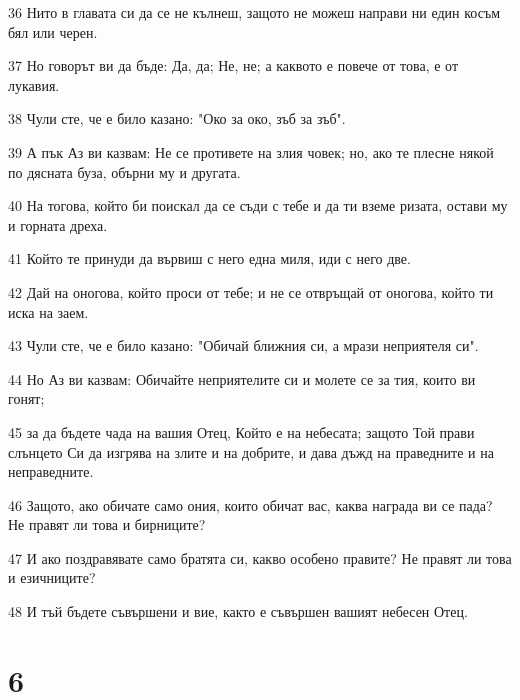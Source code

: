\par 36 Нито в главата си да се не кълнеш, защото не можеш направи ни един косъм бял или черен.
\par 37 Но говорът ви да бъде: Да, да; Не, не; а каквото е повече от това, е от лукавия.
\par 38 Чули сте, че е било казано: "Око за око, зъб за зъб".
\par 39 А пък Аз ви казвам: Не се противете на злия човек; но, ако те плесне някой по дясната буза, обърни му и другата.
\par 40 На тогова, който би поискал да се съди с тебе и да ти вземе ризата, остави му и горната дреха.
\par 41 Който те принуди да вървиш с него една миля, иди с него две.
\par 42 Дай на оногова, който проси от тебе; и не се отвръщай от оногова, който ти иска на заем.
\par 43 Чули сте, че е било казано: "Обичай ближния си, а мрази неприятеля си".
\par 44 Но Аз ви казвам: Обичайте неприятелите си и молете се за тия, които ви гонят;
\par 45 за да бъдете чада на вашия Отец, Който е на небесата; защото Той прави слънцето Си да изгрява на злите и на добрите, и дава дъжд на праведните и на неправедните.
\par 46 Защото, ако обичате само ония, които обичат вас, каква награда ви се пада? Не правят ли това и бирниците?
\par 47 И ако поздравявате само братята си, какво особено правите? Не правят ли това и езичниците?
\par 48 И тъй бъдете съвършени и вие, както е съвършен вашият небесен Отец.

\chapter{6}

